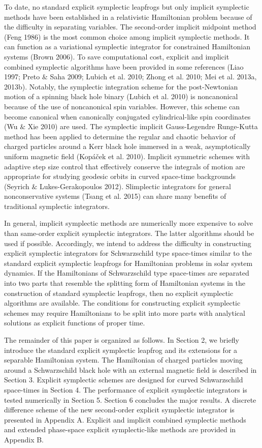 \documentclass[preprint2]{aastex}
\begin{document}
To date, no standard explicit symplectic leapfrogs but only
implicit symplectic methods have been established in a
relativistic Hamiltonian problem because of the difficulty in
separating variables. The second-order implicit midpoint method
(Feng 1986) is the most common choice among implicit symplectic
methods. It can function as a variational symplectic integrator
for constrained Hamiltonian systems (Brown 2006). To save
computational cost, explicit and implicit combined symplectic
algorithms have been provided in some references (Liao 1997; Preto
$\&$ Saha 2009; Lubich et al. 2010; Zhong et al. 2010; Mei et al.
2013a, 2013b). Notably, the symplectic integration scheme for the
post-Newtonian motion of a spinning black hole binary (Lubich et
al. 2010) is noncanonical because of the use of noncanonical spin
variables. However, this scheme can become canonical when
canonically conjugated cylindrical-like spin coordinates (Wu $\&$
Xie 2010) are used. The symplectic implicit Gauss-Legendre
Runge-Kutta method has been applied to determine the regular and
chaotic behavior of charged particles around a Kerr black hole
immersed in a weak, asymptotically uniform magnetic field
(Kop\'{a}\v{c}ek et al. 2010). Implicit symmetric schemes with
adaptive step size control that effectively conserve the integrals
of motion are appropriate for studying geodesic orbits in curved
space-time backgrounds (Seyrich $\&$ Lukes-Gerakopoulos 2012).
Slimplectic integrators for general nonconservative systems (Tsang
et al. 2015) can share many benefits of traditional symplectic
integrators.

In general, implicit symplectic methods are numerically more
expensive to solve than same-order explicit symplectic
integrators. The latter algorithms should be used if possible.
Accordingly, we intend to address the difficulty in constructing
explicit symplectic integrators for Schwarzschild type space-times
similar to the standard explicit symplectic leapfrogs for
Hamiltonian problems in solar system dynamics. If the Hamiltonians
of Schwarzschild type space-times are separated into two parts
that resemble the splitting form of Hamiltonian systems in the
construction of standard symplectic leapfrogs, then no explicit
symplectic algorithms are available. The conditions for
constructing explicit symplectic schemes may require Hamiltonians
to be split into more parts with analytical solutions as explicit
functions of proper time.

The remainder of this paper is organized as follows. In Section 2,
we briefly introduce the standard explicit symplectic leapfrog and
its extensions for a separable Hamiltonian system. The Hamiltonian
of charged particles moving around a Schwarzschild black hole with
an external magnetic field is described in Section 3. Explicit
symplectic schemes are designed for curved Schwarzschild
space-times in Section 4. The performance of explicit symplectic
integrators is tested numerically in Section 5. Section 6
concludes the major results. A discrete difference scheme of the
new second-order explicit symplectic integrator is presented in
Appendix A. Explicit and implicit combined symplectic  methods and
extended phase-space explicit symplectic-like methods are provided
in Appendix B.
\end{document}
